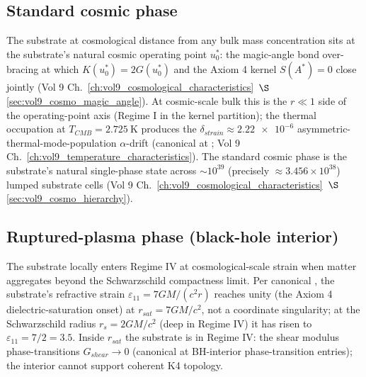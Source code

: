 \subsection{Standard cosmic phase}
\label{subsec:vol9_phase_standard}

The substrate at cosmological distance from any bulk mass concentration sits at the substrate's natural cosmic operating point $u_0^*$: the magic-angle bond over-bracing at which $K(u_0^*) = 2G(u_0^*)$ and the Axiom 4 kernel $S(A^*) = 0$ close jointly (Vol 9 Ch.~\ref{ch:vol9_cosmological_characteristics}~$\S$\ref{sec:vol9_cosmo_magic_angle}). At cosmic-scale bulk this is the $r \ll 1$ side of the operating-point axis (Regime I in the kernel partition); the thermal occupation at $T_{CMB} = \qty{2.725}{\kelvin}$ produces the $\delta_{strain} \approx \num{2.22e-6}$ asymmetric-thermal-mode-population $\alpha$-drift (canonical at ; Vol 9 Ch.~\ref{ch:vol9_temperature_characteristics}). The standard cosmic phase is the substrate's natural single-phase state across $\sim 10^{39}$ (precisely $\approx 3.456\times10^{38}$) lumped substrate cells (Vol 9 Ch.~\ref{ch:vol9_cosmological_characteristics}~$\S$\ref{sec:vol9_cosmo_hierarchy}).

\subsection{Ruptured-plasma phase (black-hole interior)}
\label{subsec:vol9_phase_ruptured_plasma}

The substrate locally enters Regime IV at cosmological-scale strain when matter aggregates beyond the Schwarzschild compactness limit. Per canonical , the substrate's refractive strain $\varepsilon_{11} = 7GM/(c^2 r)$ reaches unity (the Axiom 4 dielectric-saturation onset) at $r_{sat} = 7GM/c^2$, not a coordinate singularity; at the Schwarzschild radius $r_s = 2GM/c^2$ (deep in Regime IV) it has risen to $\varepsilon_{11} = 7/2 = 3.5$. Inside $r_{sat}$ the substrate is in Regime IV: the shear modulus phase-transitions $G_{shear} \to 0$ (canonical at  BH-interior phase-transition entries); the interior cannot support coherent K4 topology.

